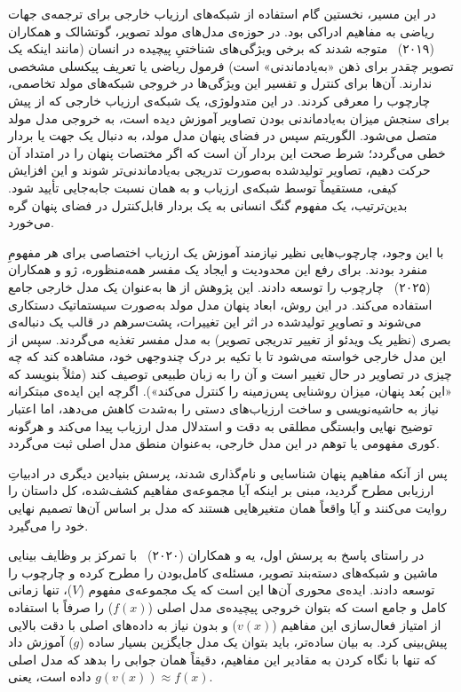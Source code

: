 در این مسیر، نخستین گام استفاده از شبکه‌های ارزیاب خارجی برای ترجمه‌ی جهات ریاضی به مفاهیم ادراکی بود. در حوزه‌ی مدل‌های مولد تصویر، گوتشالک و همکاران (۲۰۱۹)~\cite{goetschalckx2019ganalyze} متوجه شدند که برخی ویژگی‌های شناختیِ پیچیده در انسان (مانند اینکه یک تصویر چقدر برای ذهن «به‌یادماندنی» است) فرمول ریاضی یا تعریف پیکسلی مشخصی ندارند. آن‌ها برای کنترل و تفسیر این ویژگی‌ها در خروجی شبکه‌های مولد تخاصمی، چارچوب  را معرفی کردند. در این متدولوژی، یک شبکه‌ی ارزیاب خارجی که از پیش برای سنجش میزان به‌یادماندنی بودن تصاویر آموزش دیده است، به خروجی مدل مولد متصل می‌شود. الگوریتم سپس در فضای پنهان مدل مولد، به دنبال یک جهت یا بردار خطی می‌گردد؛ شرط صحت این بردار آن است که اگر مختصات پنهان را در امتداد آن حرکت دهیم، تصاویر تولیدشده به‌صورت تدریجی به‌یادماندنی‌تر شوند و این افزایش کیفی، مستقیماً توسط شبکه‌ی ارزیاب و به همان نسبت جابه‌جایی تأیید شود. بدین‌ترتیب، یک مفهوم گنگ انسانی به یک بردار قابل‌کنترل در فضای پنهان گره می‌خورد.

با این وجود، چارچوب‌هایی نظیر  نیازمند آموزش یک ارزیاب اختصاصی برای هر مفهومِ منفرد بودند. برای رفع این محدودیت و ایجاد یک مفسر همه‌منظوره، ژو و همکاران (۲۰۲۵)~\cite{zhu2025latentexplainer} چارچوب  را توسعه دادند. این پژوهش از ها به‌عنوان یک مدل خارجی جامع استفاده می‌کند. در این روش، ابعاد پنهان مدل مولد به‌صورت سیستماتیک دستکاری می‌شوند و تصاویرِ تولیدشده در اثر این تغییرات، پشت‌سرهم در قالب یک دنباله‌ی بصری (نظیر یک ویدئو از تغییر تدریجی تصویر) به مدل مفسر تغذیه می‌گردند. سپس از این مدل خارجی خواسته می‌شود تا با تکیه بر درک چندوجهی خود، مشاهده کند که چه چیزی در تصاویر در حال تغییر است و آن را به زبان طبیعی توصیف کند (مثلاً بنویسد که «این بُعد پنهان، میزان روشنایی پس‌زمینه را کنترل می‌کند»). اگرچه این ایده‌ی مبتکرانه نیاز به حاشیه‌نویسی و ساخت ارزیاب‌های دستی را به‌شدت کاهش می‌دهد، اما اعتبار توضیح نهایی وابستگی مطلقی به دقت و استدلال مدل ارزیاب پیدا می‌کند و هرگونه کوری مفهومی یا توهم در این مدل خارجی، به‌عنوان منطق مدل اصلی ثبت می‌گردد.

پس از آنکه مفاهیم پنهان شناسایی و نام‌گذاری شدند، پرسش بنیادین دیگری در ادبیاتِ ارزیابی مطرح گردید، مبنی بر اینکه آیا مجموعه‌ی مفاهیم کشف‌شده، کل داستان را روایت می‌کنند و آیا واقعاً همان متغیرهایی هستند که مدل بر اساس آن‌ها تصمیم نهایی خود را می‌گیرد.

در راستای پاسخ به پرسش اول، یه و همکاران (۲۰۲۰)~\cite{yen2020completeness} با تمرکز بر وظایف بینایی ماشین و شبکه‌های دسته‌بند تصویر، مسئله‌ی کامل‌بودن را مطرح کرده و چارچوب  را توسعه دادند. ایده‌ی محوری آن‌ها این است که یک مجموعه‌ی مفهوم ($V$)، تنها زمانی کامل و جامع است که بتوان خروجی پیچیده‌ی مدل اصلی ($f(x)$) را صرفاً با استفاده از امتیاز فعال‌سازی این مفاهیم ($v(x)$) و بدون نیاز به داده‌های اصلی با دقت بالایی پیش‌بینی کرد. به بیان ساده‌تر، باید بتوان یک مدل جایگزین بسیار ساده ($g$) آموزش داد که تنها با نگاه کردن به مقادیر این مفاهیم، دقیقاً همان جوابی را بدهد که مدل اصلی داده است، یعنی $g(v(x)) \approx f(x)$.

